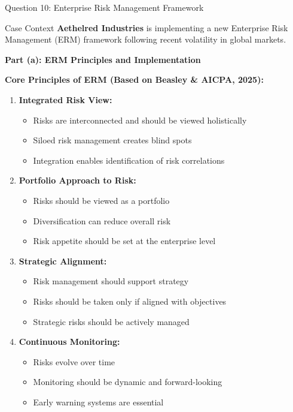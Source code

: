 \documentclass[aspectratio=169]{beamer}
\newcommand{\question}[1]{{\large\bfseries\color{crimson}#1}}
\begin{document}
	\begin{frame}{Question 10: Enterprise Risk Management Framework}
		\begin{block}{Case Context}
			\textbf{Aethelred Industries} is implementing a new Enterprise Risk Management (ERM) framework following recent volatility in global markets.
		\end{block}
		
		\question{Part (a): ERM Principles and Implementation}
		
		\textbf{Core Principles of ERM (Based on Beasley \& AICPA, 2025):}
		
		\begin{enumerate}
			\item \textbf{Integrated Risk View:}
			\begin{itemize}
				\item Risks are interconnected and should be viewed holistically
				\item Siloed risk management creates blind spots
				\item Integration enables identification of risk correlations
			\end{itemize}
			
			\item \textbf{Portfolio Approach to Risk:}
			\begin{itemize}
				\item Risks should be viewed as a portfolio
				\item Diversification can reduce overall risk
				\item Risk appetite should be set at the enterprise level
			\end{itemize}
			
			\item \textbf{Strategic Alignment:}
			\begin{itemize}
				\item Risk management should support strategy
				\item Risks should be taken only if aligned with objectives
				\item Strategic risks should be actively managed
			\end{itemize}
			
			\item \textbf{Continuous Monitoring:}
			\begin{itemize}
				\item Risks evolve over time
				\item Monitoring should be dynamic and forward-looking
				\item Early warning systems are essential
			\end{itemize}
		\end{enumerate}
	\end{frame}
	
\end{document}
